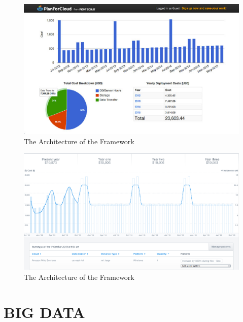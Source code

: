 \documentclass{sig-alternate}
\begin{document}
\begin{figure}[htb] 
  \centering 
    \includegraphics[width=1.0\columnwidth]{images/fig3b.pdf} 
  \caption{The Architecture of the Framework}\label{F:fig7} 
\end{figure} 

\begin{figure}[htb] 
  \centering 
    \includegraphics[width=1.0\columnwidth]{images/fig4b.pdf} 
  \caption{The Architecture of the Framework}\label{F:fig8} 
\end{figure} 


\section{BIG DATA}
\end{document}
